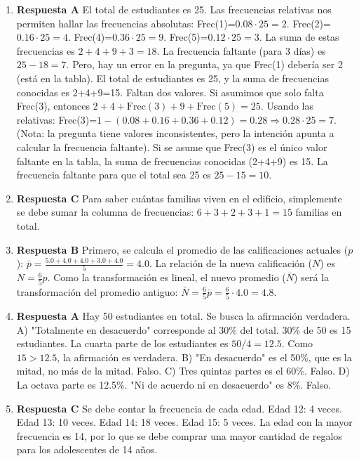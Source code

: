 \documentclass[11pt]{article}
\begin{document}
\begin{enumerate}
    \item \textbf{Respuesta A} El total de estudiantes es 25. Las frecuencias relativas nos permiten hallar las frecuencias absolutas: Frec(1)=$0.08 \cdot 25=2$. Frec(2)=$0.16 \cdot 25=4$. Frec(4)=$0.36 \cdot 25=9$. Frec(5)=$0.12 \cdot 25=3$. La suma de estas frecuencias es $2+4+9+3=18$. La frecuencia faltante (para 3 días) es $25-18=7$. Pero, hay un error en la pregunta, ya que Frec(1) debería ser 2 (está en la tabla). El total de estudiantes es 25, y la suma de frecuencias conocidas es 2+4+9=15. Faltan dos valores. Si asumimos que solo falta Frec(3), entonces $2+4+\text{Frec}(3)+9+\text{Frec}(5) = 25$. Usando las relativas: Frec(3)=$1-(0.08+0.16+0.36+0.12) = 0.28 \Rightarrow 0.28 \cdot 25=7$.  (Nota: la pregunta tiene valores inconsistentes, pero la intención apunta a calcular la frecuencia faltante). Si se asume que Frec(3) es el único valor faltante en la tabla, la suma de frecuencias conocidas (2+4+9) es 15. La frecuencia faltante para que el total sea 25 es $25-15=10$. %

    \item \textbf{Respuesta C} Para saber cuántas familias viven en el edificio, simplemente se debe sumar la columna de frecuencias: $6+3+2+3+1=15$ familias en total. %

    \item \textbf{Respuesta B} Primero, se calcula el promedio de las calificaciones actuales ($p$): $\bar{p}=\frac{5.0+4.0+4.0+3.0+4.0}{5}=4.0$. La relación de la nueva calificación ($N$) es $N=\frac{6}{5}p$. Como la transformación es lineal, el nuevo promedio ($\bar{N}$) será la transformación del promedio antiguo: $\bar{N} = \frac{6}{5}\bar{p} = \frac{6}{5} \cdot 4.0 = 4.8$. %
    
    \item \textbf{Respuesta A} Hay 50 estudiantes en total. Se busca la afirmación verdadera. A) "Totalmente en desacuerdo" corresponde al 30\% del total. $30\%$ de 50 es 15 estudiantes. La cuarta parte de los estudiantes es $50/4 = 12.5$. Como $15 > 12.5$, la afirmación es verdadera. B) "En desacuerdo" es el 50\%, que es la mitad, no más de la mitad. Falso. C) Tres quintas partes es el 60\%. Falso. D) La octava parte es 12.5\%. "Ni de acuerdo ni en desacuerdo" es 8\%. Falso. %
    
    \item \textbf{Respuesta C} Se debe contar la frecuencia de cada edad. Edad 12: 4 veces. Edad 13: 10 veces. Edad 14: 18 veces. Edad 15: 5 veces. La edad con la mayor frecuencia es 14, por lo que se debe comprar una mayor cantidad de regalos para los adolescentes de 14 años. %


\end{enumerate}
\end{document}
